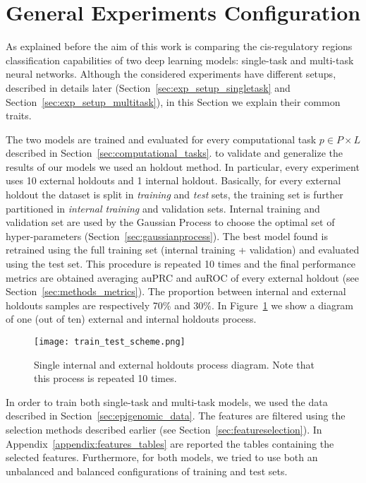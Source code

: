 \section{General Experiments Configuration}
\label{sec:exp_setup_general}
As explained before the aim of this work is comparing the  cis-regulatory regions classification capabilities of two deep learning models: single-task and multi-task neural networks. Although the considered experiments have different setups, described in details later (Section~\ref{sec:exp_setup_singletask} and Section~\ref{sec:exp_setup_multitask}), in this Section we explain their common traits. 

The two models are trained and evaluated for every computational task $p \in P \times L$ described in Section~\ref{sec:computational_tasks}. 
to validate and generalize the results of our
models we used an holdout method. In particular, every experiment uses 10 external holdouts and 1 internal
holdout. Basically, for every external
holdout the dataset is split in \emph{training} and \emph{test} sets, the
training set is further partitioned in \emph{internal training} and validation
sets. Internal training and validation set are used by the Gaussian Process to
choose the optimal set of hyper-parameters (Section~\ref{sec:gaussianprocess}).
The best model found is retrained using the full training set (internal training + validation) and evaluated using the test set. This procedure is
repeated 10 times and the final performance metrics are obtained averaging auPRC
and auROC of every external holdout (see Section~\ref{sec:methods_metrics}). The proportion between internal and external holdouts samples are respectively 70\% and 30\%. In Figure~\ref{fig:train_test_diagram} we show a diagram of one (out of ten) external and internal holdouts process. 
\begin{figure}[ht]
\centering
\texttt{[image: train\_test\_scheme.png]}
\caption{Single internal and external holdouts process diagram. Note that this
process is repeated 10 times.} 
\label{fig:train_test_diagram}
\end{figure}
In order to train both single-task and multi-task models, we used the data described in Section~\ref{sec:epigenomic_data}. The features are filtered using the selection methods described earlier (see Section~\ref{sec:featureselection}). In Appendix~\ref{appendix:features_tables} are reported the tables containing the selected features. 
Furthermore, for both models, we tried to use both an unbalanced and balanced configurations of training and test sets. 

